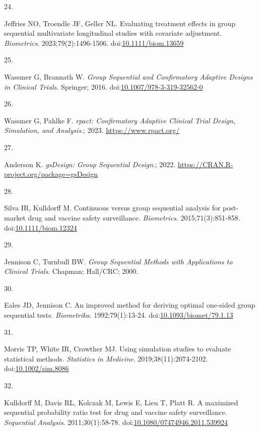 \documentclass[
  11pt,
]{article}
\newlength{\cslhangindent}
\newlength{\csllabelwidth}
\newenvironment{CSLReferences}[2] %
 {\begin{list}{}{%
  \setlength{\itemindent}{0pt}
  \setlength{\leftmargin}{0pt}
  \setlength{\parsep}{0pt}
  \ifodd #1
   \setlength{\leftmargin}{\cslhangindent}
   \setlength{\itemindent}{-1\cslhangindent}
  \fi
  \setlength{\itemsep}{#2\baselineskip}}}
 {\end{list}}
\newcommand{\CSLLeftMargin}[1]{\parbox[t]{\csllabelwidth}{\strut#1\strut}}
\newcommand{\CSLRightInline}[1]{\parbox[t]{\linewidth - \csllabelwidth}{\strut#1\strut}}
\begin{document}
\begin{CSLReferences}{0}{1}
\CSLLeftMargin{24. }%
\CSLRightInline{Jeffries NO, Troendle JF, Geller NL. Evaluating treatment effects in group sequential multivariate longitudinal studies with covariate adjustment. \emph{Biometrics}. 2023;79(2):1496-1506. doi:\href{https://doi.org/10.1111/biom.13659}{10.1111/biom.13659}}

\CSLLeftMargin{25. }%
\CSLRightInline{Wassmer G, Brannath W. \emph{Group Sequential and Confirmatory Adaptive Designs in Clinical Trials}. Springer; 2016. doi:\href{https://doi.org/10.1007/978-3-319-32562-0}{10.1007/978-3-319-32562-0}}

\CSLLeftMargin{26. }%
\CSLRightInline{Wassmer G, Pahlke F. \emph{{rpact}: Confirmatory Adaptive Clinical Trial Design, Simulation, and Analysis}.; 2023. \url{https://www.rpact.org/}}

\CSLLeftMargin{27. }%
\CSLRightInline{Anderson K. \emph{{gsDesign}: Group Sequential Design}.; 2022. \url{https://CRAN.R-project.org/package=gsDesign}}

\CSLLeftMargin{28. }%
\CSLRightInline{Silva IR, Kulldorff M. Continuous versus group sequential analysis for post-market drug and vaccine safety surveillance. \emph{Biometrics}. 2015;71(3):851-858. doi:\href{https://doi.org/10.1111/biom.12324}{10.1111/biom.12324}}

\CSLLeftMargin{29. }%
\CSLRightInline{Jennison C, Turnbull BW. \emph{Group Sequential Methods with Applications to Clinical Trials}. Chapman; Hall/CRC; 2000.}

\CSLLeftMargin{30. }%
\CSLRightInline{Eales JD, Jennison C. An improved method for deriving optimal one-sided group sequential tests. \emph{Biometrika}. 1992;79(1):13-24. doi:\href{https://doi.org/10.1093/biomet/79.1.13}{10.1093/biomet/79.1.13}}

\CSLLeftMargin{31. }%
\CSLRightInline{Morris TP, White IR, Crowther MJ. Using simulation studies to evaluate statistical methods. \emph{Statistics in Medicine}. 2019;38(11):2074-2102. doi:\href{https://doi.org/10.1002/sim.8086}{10.1002/sim.8086}}

\CSLLeftMargin{32. }%
\CSLRightInline{Kulldorff M, Davis RL, Kolczak M, Lewis E, Lieu T, Platt R. A maximized sequential probability ratio test for drug and vaccine safety surveillance. \emph{Sequential Analysis}. 2011;30(1):58-78. doi:\href{https://doi.org/10.1080/07474946.2011.539924}{10.1080/07474946.2011.539924}}


\end{CSLReferences}
\end{document}
